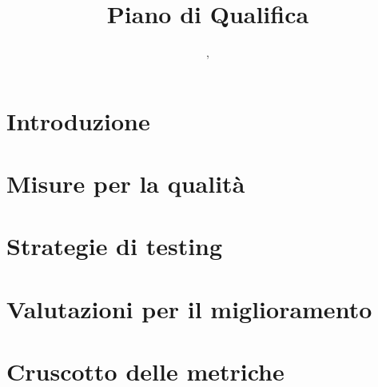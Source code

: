 \documentclass{classes/base}
\title{Piano di Qualifica}
\author{\tommaso, \\ \matteo}
\begin{document}
	\maketitle
	\newpage
	
	\newpage
	\tableofcontents
	\newpage
	\listoftables
	\newpage
	\listoffigures
	
	\newpage
	\section{Introduzione}
	
	
    \newpage
	\section{Misure per la qualità}
	
	
	\newpage
	\section{Strategie di testing}
	
	
	\newpage
	\section{Valutazioni per il miglioramento}
	
	
	\newpage
	\section{Cruscotto delle metriche}
	
\end{document}
